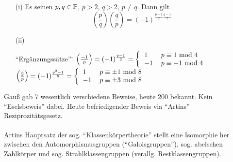 \documentclass[a4paper,twoside,DIV15,BCOR12mm]{scrbook}
\begin{document}
\begin{satz}
\begin{enumerate}
\item[(i)] Es seinen $p,q\in\mathbb{P}$, $p>2$, $q>2$, $p \neq q$. Dann gilt
$$\left(\frac{p}{q}\right)\left(\frac{q}{p}\right)=(-1)^{\frac{p-1}{2}\frac{q-1}{2}}$$
\item[(ii)] \begin{tabbing}
    "`Ergänzungssätze"' \= $\left(\frac{-1}{p}\right) = (-1)^\frac{p-1}{2} = \left\{\mbox{\begin{tabular}{ll}
    $1$ & $p \equiv 1$ mod $4$\\
    $-1$ & $p \equiv -1$ mod $4$
  \end{tabular}}\right.$ \\
  \> $\left(\frac{2}{p}\right) = (-1)^\frac{p^2-1}{8} = \left\{\mbox{\begin{tabular}{ll}
    $1$ & $p \equiv \pm 1$ mod $8$\\
    $-1$ & $p \equiv \pm 3$ mod $8$
  \end{tabular}}\right.$
\end{tabbing}
\end{enumerate}
\end{satz}
Gauß gab 7 wesentlich verschiedene Beweise, heute 200 bekannt. Kein "`Eselsbeweis"' dabei. Heute befriedigender Beweis via "`Artins"' Reziprozitätsgesetz.\\
\\
Artins Hauptsatz der sog. "`Klassenkörpertheorie"' stellt eine Isomorphie her zwischen den Automorphismusgruppen ("`Galoisgruppen"'), sog. abelschen Zahlkörper und sog. Strahlklassengruppen (verallg. Restklassengruppen).\\
\\
\end{document}
